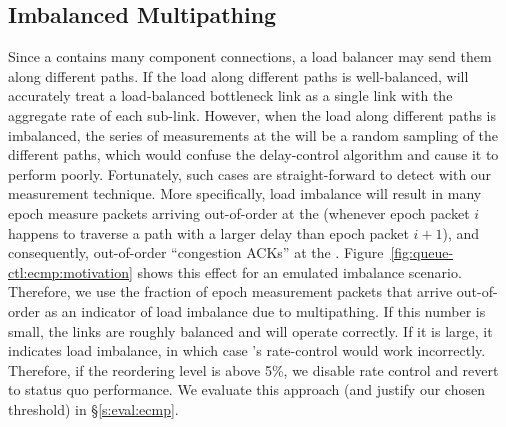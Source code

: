 \subsection{Imbalanced Multipathing}\label{s:queue-ctl:ecmp}
Since a \bundle contains many component connections, a load balancer may send them along different paths. If the load along different paths is well-balanced, \name will accurately treat a load-balanced bottleneck link as a single link with the aggregate rate of each sub-link. However, when the load along different paths is imbalanced, the series of measurements at the \name will be a random sampling of the different paths, which would confuse the delay-control algorithm and cause it to perform poorly. Fortunately, such cases are straight-forward to detect with our measurement technique. 
More specifically, load imbalance will result in many epoch measure packets arriving out-of-order at the \outbox (whenever epoch packet $i$ happens to traverse a path with a larger delay than epoch packet $i+1$), and consequently, out-of-order ``congestion ACKs'' at the \inbox.  Figure~\ref{fig:queue-ctl:ecmp:motivation} shows this effect for an emulated imbalance scenario. Therefore, we use the fraction of epoch measurement packets that arrive out-of-order as an indicator of load imbalance due to multipathing. 
If this number is small, the links are roughly balanced and \name will operate correctly.
If it is large, it indicates load imbalance, in which case \name's rate-control would work incorrectly. 
Therefore, if the reordering level is above 5\%, we disable rate control and revert to status quo performance. We evaluate this approach (and justify our chosen threshold) in \S\ref{s:eval:ecmp}.

